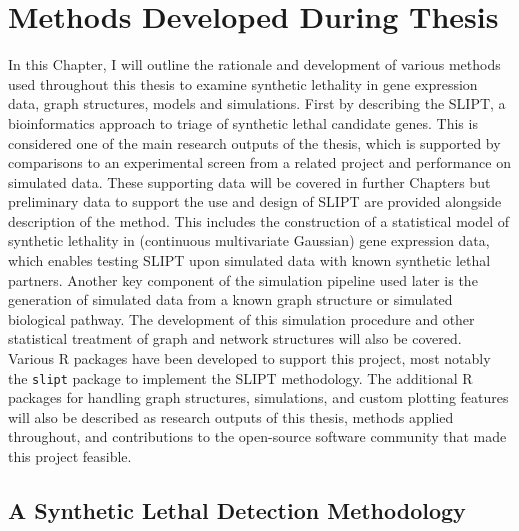 \chapter{Methods Developed During Thesis}
\label{chap:methods_dev}

In this Chapter, I will outline the rationale and development of various methods used throughout this thesis to examine synthetic lethality in gene expression data, graph structures, models and simulations. First by describing the \acrfull{SLIPT}, a bioinformatics approach to triage of synthetic lethal candidate genes. This is considered one of the main research outputs of the thesis, which is supported by comparisons to an experimental screen from a related project and performance on simulated data. These supporting data will be covered in further Chapters but preliminary data to support the use and design of \gls{SLIPT} are provided alongside description of the method. This includes the construction of a statistical model of synthetic lethality in (continuous multivariate Gaussian) gene expression data, which enables testing \gls{SLIPT} upon simulated data with known synthetic lethal partners. Another key component of the simulation pipeline used later is the generation of simulated data from a known graph structure or simulated biological pathway. The development of this simulation procedure and other statistical treatment of graph and network structures will also be covered. Various R packages have been developed to support this project, most notably the \texttt{slipt} package to implement the \gls{SLIPT} methodology. The additional R packages for handling graph structures, simulations, and custom plotting features will also be described as research outputs of this thesis, methods applied throughout, and contributions to the open-source software community that made this project feasible.

\section{A Synthetic Lethal Detection Methodology} \label{methods:SLIPT}

